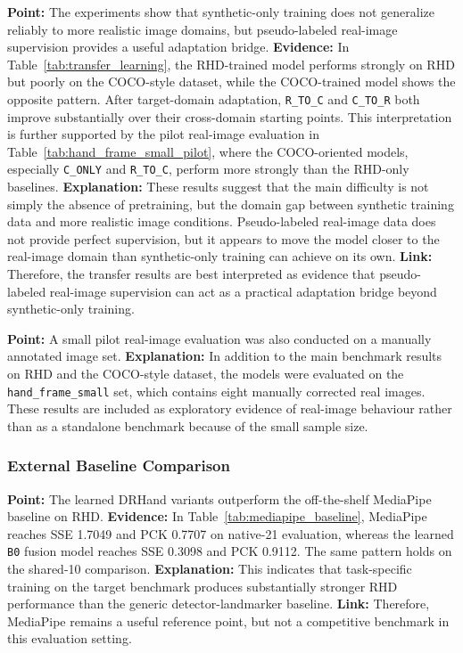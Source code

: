 \documentclass[10pt,letterpaper]{article}
\begin{document}
\medskip
\noindent\textbf{Point:} The experiments show that synthetic-only training does not generalize reliably to more realistic image domains, but pseudo-labeled real-image supervision provides a useful adaptation bridge.  
\textbf{Evidence:} In Table~\ref{tab:transfer_learning}, the RHD-trained model performs strongly on RHD but poorly on the COCO-style dataset, while the COCO-trained model shows the opposite pattern. After target-domain adaptation, \texttt{R\_TO\_C} and \texttt{C\_TO\_R} both improve substantially over their cross-domain starting points. This interpretation is further supported by the pilot real-image evaluation in Table~\ref{tab:hand_frame_small_pilot}, where the COCO-oriented models, especially \texttt{C\_ONLY} and \texttt{R\_TO\_C}, perform more strongly than the RHD-only baselines.  
\textbf{Explanation:} These results suggest that the main difficulty is not simply the absence of pretraining, but the domain gap between synthetic training data and more realistic image conditions. Pseudo-labeled real-image data does not provide perfect supervision, but it appears to move the model closer to the real-image domain than synthetic-only training can achieve on its own.  
\textbf{Link:} Therefore, the transfer results are best interpreted as evidence that pseudo-labeled real-image supervision can act as a practical adaptation bridge beyond synthetic-only training.

\medskip
\noindent\textbf{Point:} A small pilot real-image evaluation was also conducted on a manually annotated image set.  
\textbf{Explanation:} In addition to the main benchmark results on RHD and the COCO-style dataset, the models were evaluated on the \texttt{hand\_frame\_small} set, which contains eight manually corrected real images. These results are included as exploratory evidence of real-image behaviour rather than as a standalone benchmark because of the small sample size.

\subsubsection{External Baseline Comparison}

\medskip
\noindent\textbf{Point:} The learned DRHand variants outperform the off-the-shelf MediaPipe baseline on RHD.  
\textbf{Evidence:} In Table~\ref{tab:mediapipe_baseline}, MediaPipe reaches SSE 1.7049 and PCK 0.7707 on native-21 evaluation, whereas the learned \texttt{B0} fusion model reaches SSE 0.3098 and PCK 0.9112. The same pattern holds on the shared-10 comparison.  
\textbf{Explanation:} This indicates that task-specific training on the target benchmark produces substantially stronger RHD performance than the generic detector-landmarker baseline.  
\textbf{Link:} Therefore, MediaPipe remains a useful reference point, but not a competitive benchmark in this evaluation setting.
\end{document}
